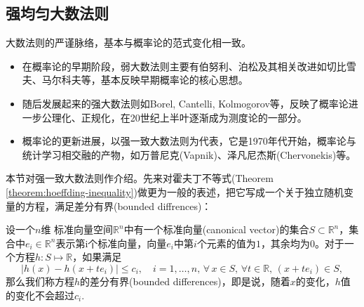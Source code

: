 \subsection{强均匀大数法则}
\label{sec:lln-sulln}

大数法则的严谨脉络，基本与概率论的范式变化相一致。
\begin{itemize}
\item 在概率论的早期阶段，弱大数法则主要有伯努利、泊松及其相关改进如切比雪夫、马尔科夫等，基本反映早期概率论的核心思想。

\item 随后发展起来的强大数法则如Borel, Cantelli, Kolmogorov等，反映了概率论进一步公理化、正规化，在20世纪上半叶逐渐成为测度论的一部分。

\item 概率论的更新进展，以强一致大数法则为代表，它是1970年代开始，概率论与统计学习相交融的产物，如万普尼克(Vapnik)、泽凡尼杰斯(Chervonekis)等。
\end{itemize}

本节对强一致大数法则作介绍。先来对霍夫丁不等式(Theorem \ref{theorem:hoeffding-inequality})做更为一般的表述，把它写成一个关于独立随机变量的方程，满足差分有界(bounded diffrences)：

\begin{definition}[差分有界]
  \label{definition:bounded-diff}
  设一个$n$维
  标准向量空间$\mathbb{R}^{n}$中有一个标准向量(canonical vector)的集合$S \subset \mathbb{R}^{n}$，集合中$e_{i} \in \mathbb{R}^{n}$表示第i个标准向量，向量$e_{i}$中第$i$个元素的值为$1$，其余均为$0$。对于一个方程$h:S \mapsto \mathbb{R}$，如果满足
  \begin{equation}
    \label{eq:lln-sulln-bounded-diff}
    \left| h(x) - h(x + t e_{i}) \right| \le c_{i}, \quad i=1,\ldots,n, \, \forall \, x \in S, \, \forall t \in \mathbb{R}, \, \left( x + t e_{i} \right) \in S,
  \end{equation}
  那么我们称方程$h$的差分有界(bounded differences)，即是说，随着$x$的变化，$h$值的变化不会超过$c_{i}$.
\end{definition}

